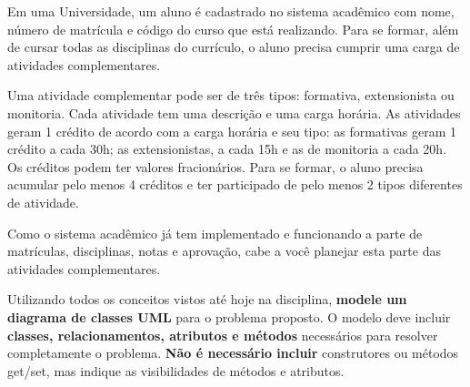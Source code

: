 \documentclass{lib/eng_softdoc}
\begin{document}
\makeheader

\problem Em uma Universidade, um aluno é cadastrado no sistema acadêmico com nome, número de matrícula e código do
curso que está realizando. Para se formar, além de cursar todas as disciplinas do currículo, o aluno precisa cumprir uma
carga de atividades complementares.

Uma atividade complementar pode ser de três tipos: formativa, extensionista ou monitoria. Cada atividade tem
uma descrição e uma carga horária. As atividades geram 1 crédito de acordo com a carga horária e seu tipo: as formativas
geram 1 crédito a cada 30h; as extensionistas, a cada 15h e as de monitoria a cada 20h. Os créditos podem ter valores
fracionários. Para se formar, o aluno precisa acumular pelo menos 4 créditos e ter participado de pelo menos 2 tipos
diferentes de atividade.

Como o sistema acadêmico já tem implementado e funcionando a parte de matrículas, disciplinas, notas e
aprovação, cabe a você planejar esta parte das atividades complementares.


\subproblem Utilizando todos os conceitos vistos até hoje na disciplina, \textbf{modele um diagrama de classes UML} para o problema proposto. O modelo deve incluir \textbf{classes, relacionamentos, atributos e métodos} necessários para resolver completamente o problema.
\textbf{Não é necessário incluir} construtores ou métodos get/set, mas indique as visibilidades de métodos e atributos. 

\answer 
\\
\end{document}

